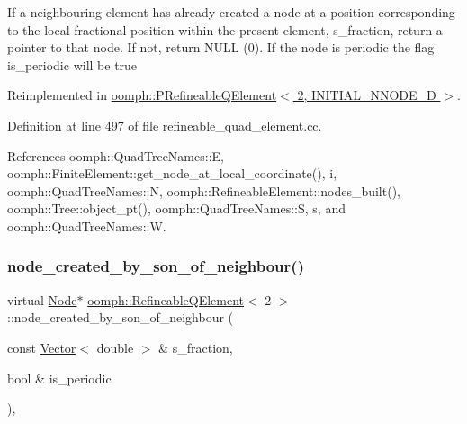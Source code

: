 If a neighbouring element has already created a node at a position corresponding to the local fractional position within the present element, s\+\_\+fraction, return a pointer to that node. If not, return N\+U\+LL (0). If the node is periodic the flag is\+\_\+periodic will be true 

Reimplemented in \hyperlink{classoomph_1_1PRefineableQElement_3_012_00_01INITIAL__NNODE__1D_01_4_aaaef5f28edec53e201f87c3c9f2c0f61}{oomph\+::\+P\+Refineable\+Q\+Element$<$ 2, I\+N\+I\+T\+I\+A\+L\+\_\+\+N\+N\+O\+D\+E\+\_\+D $>$}.



Definition at line 497 of file refineable\+\_\+quad\+\_\+element.\+cc.



References oomph\+::\+Quad\+Tree\+Names\+::E, oomph\+::\+Finite\+Element\+::get\+\_\+node\+\_\+at\+\_\+local\+\_\+coordinate(), i, oomph\+::\+Quad\+Tree\+Names\+::N, oomph\+::\+Refineable\+Element\+::nodes\+\_\+built(), oomph\+::\+Tree\+::object\+\_\+pt(), oomph\+::\+Quad\+Tree\+Names\+::S, s, and oomph\+::\+Quad\+Tree\+Names\+::W.

\mbox{\label{classoomph_1_1RefineableQElement_3_012_01_4_ae989507794716d3ab8d0d2fd32dce28f}} 
\subsubsection{\texorpdfstring{node\+\_\+created\+\_\+by\+\_\+son\+\_\+of\+\_\+neighbour()}{node\_created\_by\_son\_of\_neighbour()}}
{\footnotesize\ttfamily virtual \hyperlink{classoomph_1_1Node}{Node}$\ast$ \hyperlink{classoomph_1_1RefineableQElement}{oomph\+::\+Refineable\+Q\+Element}$<$ 2 $>$\+::node\+\_\+created\+\_\+by\+\_\+son\+\_\+of\+\_\+neighbour (\begin{DoxyParamCaption}\item[{const \hyperlink{classoomph_1_1Vector}{Vector}$<$ double $>$ \&}]{s\+\_\+fraction,  }\item[{bool \&}]{is\+\_\+periodic }\end{DoxyParamCaption})\hspace{0.3cm}{\ttfamily [inline]}, {\ttfamily [virtual]}}



